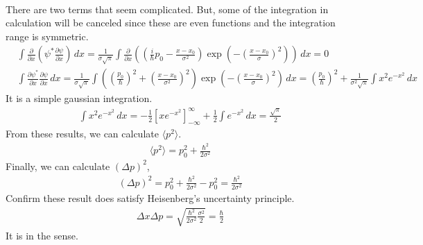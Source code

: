 \documentclass[aps,floatfix,nofootinbib,superscriptaddress,fleqn]{revtex4}
\begin{document}
\begin{itemize}
\begin{align}
\end{align}
There are two terms that seem complicated. But, some of the integration in calculation will be canceled since these are even functions and the integration range is symmetric.
\begin{align}   
       &\int \frac{\partial}{\partial x}
          \left(\psi^* \frac{\partial \psi}{\partial x}
          \right) \,dx 
          = \frac{1}{\sigma\sqrt{\pi}}\int\frac{\partial}{\partial x}
            \left(
              \left(\frac{i}{\hbar}p_0-\frac{x-x_0}{\sigma^2}
              \right)\exp
                \left(-{
                  \left(\frac{x-x_0}{\sigma}
                  \right)}^2 
                \right)
              \right)\,dx = 0
   \\  &\int \frac{\partial \psi^*}{\partial x}\frac{\partial \psi}{\partial x} \,dx 
          = \frac{1}{\sigma\sqrt{\pi}}\int
            \left(
              \left(\frac{p_0}{\hbar}
                                     \right)^2
             +\left(\frac{x-x_0}{\sigma^2}
                                          \right)^2
                                                    \right)\exp
            \left(-{
              \left(\frac{x-x_0}{\sigma}
                                        \right)}^2
                                                  \right)\,dx 
          = \left(\frac{p_0}{\hbar}
                                    \right)^2+\frac{1}{\sigma^2\sqrt{\pi}}\int x^2e^{-x^2}\,dx
\end{align}
It is a simple gaussian integration.
\begin{align}
  \int x^2e^{-x^2}\,dx = -\frac{1}{2}\left[xe^{-x^2}\right]^{\infty}_{-\infty}+\frac{1}{2}\int e^{-x^2}\,dx = \frac{\sqrt{\pi}}{2}
\end{align}
From these results, we can calculate $\langle p^2 \rangle$.
\begin{align}
  \langle p^2 \rangle = p_0^2 + \frac{\hbar^2}{2\sigma^2}
\end{align}
Finally, we can calculate $\left( \Delta p \right)^2$,
\begin{align}
  \left( \Delta p \right)^2 = p_0^2 + \frac{\hbar^2}{2\sigma^2} - p_0^2 = \frac{\hbar^2}{2\sigma^2}
\end{align}
Confirm these result does satisfy Heisenberg's uncertainty principle.
\begin{align}
  \Delta x \Delta p = \sqrt{\frac{\hbar^2}{2\sigma^2}\frac{\sigma^2}{2}} = \frac{\hbar}{2}
\end{align}
It is in the sense.
  \end{itemize}
\end{document}
